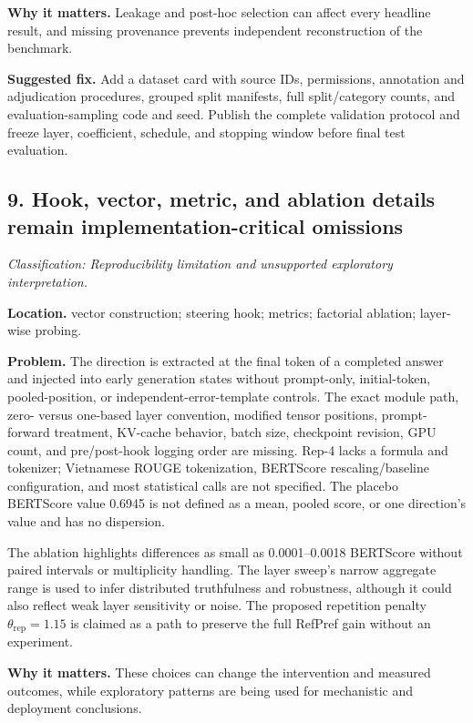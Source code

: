 \documentclass[11pt]{article}
\newcommand{\findinglabel}[1]{\textbf{#1}}
\newcommand{\classification}[1]{\textit{Classification: #1.}}
\begin{document}
\findinglabel{Why it matters.} Leakage and post-hoc selection can affect every headline result, and missing provenance prevents independent reconstruction of the benchmark.

\findinglabel{Suggested fix.} Add a dataset card with source IDs, permissions, annotation and adjudication procedures, grouped split manifests, full split/category counts, and evaluation-sampling code and seed.  Publish the complete validation protocol and freeze layer, coefficient, schedule, and stopping window before final test evaluation.

\subsection*{9. Hook, vector, metric, and ablation details remain implementation-critical omissions}

\classification{Reproducibility limitation and unsupported exploratory interpretation}

\findinglabel{Location.} vector construction; steering hook; metrics; factorial ablation; layer-wise probing.

\findinglabel{Problem.} The direction is extracted at the final token of a completed answer and injected into early generation states without prompt-only, initial-token, pooled-position, or independent-error-template controls.  The exact module path, zero- versus one-based layer convention, modified tensor positions, prompt-forward treatment, KV-cache behavior, batch size, checkpoint revision, GPU count, and pre/post-hook logging order are missing.  Rep-4 lacks a formula and tokenizer; Vietnamese ROUGE tokenization, BERTScore rescaling/baseline configuration, and most statistical calls are not specified.  The placebo BERTScore value 0.6945 is not defined as a mean, pooled score, or one direction's value and has no dispersion.

The ablation highlights differences as small as 0.0001--0.0018 BERTScore without paired intervals or multiplicity handling.  The layer sweep's narrow aggregate range is used to infer distributed truthfulness and robustness, although it could also reflect weak layer sensitivity or noise.  The proposed repetition penalty $\theta_{\text{rep}}=1.15$ is claimed as a path to preserve the full RefPref gain without an experiment.

\findinglabel{Why it matters.} These choices can change the intervention and measured outcomes, while exploratory patterns are being used for mechanistic and deployment conclusions.
\end{document}

